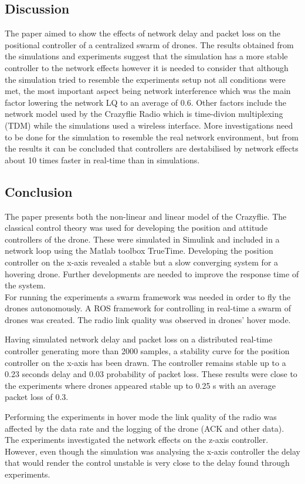 \subsection{Discussion}
The paper aimed to show the effects of network delay and packet loss on the positional controller of a centralized swarm of drones. The results obtained from the simulations and experiments suggest that the simulation has a more stable controller to the network effects however it is needed to consider that although the simulation tried to resemble the experiments setup not all conditions were met, the most important aspect being network interference which was the main factor lowering the network LQ to an average of 0.6.  Other factors include the network model used by the Crazyflie Radio which is time-divion multiplexing (TDM) while the simulations used a wireless interface. More investigations need to be done for the simulation to resemble the real network environment, but from the results it can be concluded that controllers are destabilised by network effects about 10 times faster in real-time than in simulations. 

\subsection{Conclusion}
The paper presents both the non-linear and linear model of the Crazyflie. The classical control theory was used for developing the position and attitude controllers of the drone. These were simulated in Simulink and included in a network loop using the Matlab toolbox TrueTime. Developing the position controller on the x-axis revealed a stable but a slow converging system for a hovering drone. Further developments are needed to improve the response time of the system.\\ 

\noindent For running the experiments a swarm framework was needed in order to fly the drones autonomously. A ROS framework for controlling in real-time a swarm of drones was created. The radio link quality was observed in drones' hover mode.

Having simulated network delay and packet loss on a distributed real-time controller generating more than 2000 samples, a stability curve for the position controller on the x-axis has been drawn. The controller remains stable up to a 0.23 seconds delay and 0.03 probability of packet loss. These results were close to the experiments where drones appeared stable up to 0.25 s with an average packet loss of 0.3.

Performing the experiments in hover mode the link quality of the radio was affected by the data rate and the logging of the drone (ACK and other data). The experiments investigated the network effects on the z-axis controller. However, even though the simulation was analysing the x-axis controller the delay that would render the control unstable is very close to the delay found through experiments.